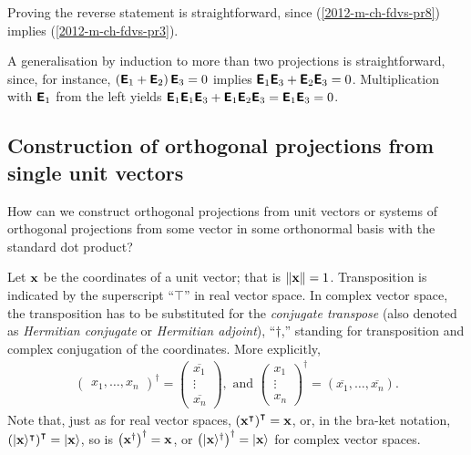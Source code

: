 {Proving the reverse statement is straightforward, since (\ref{2012-m-ch-fdvs-pr8}) implies  (\ref{2012-m-ch-fdvs-pr3}).

A generalisation by induction to more than two projections is straightforward,
since, for instance,
$\left(\textsf{\textbf{E}}_1+\textsf{\textbf{E}}_2\right)\textsf{\textbf{E}}_3=0$
implies
$ \textsf{\textbf{E}}_1\textsf{\textbf{E}}_3+\textsf{\textbf{E}}_2\textsf{\textbf{E}}_3=0$.
Multiplication with $\textsf{\textbf{E}}_1$ from the left yields
$
\textsf{\textbf{E}}_1\textsf{\textbf{E}}_1\textsf{\textbf{E}}_3+\textsf{\textbf{E}}_1\textsf{\textbf{E}}_2\textsf{\textbf{E}}_3=
\textsf{\textbf{E}}_1 \textsf{\textbf{E}}_3=
0$.
 \eproof }


\subsection{Construction of orthogonal projections from  single unit vectors}

How can we construct  orthogonal projections from unit vectors or systems of orthogonal projections from some vector in some orthonormal basis
with the standard dot product?

Let ${\bf x}$ be the coordinates of a unit vector;
that is $\|{\bf x} \| =1$.
Transposition is indicated by the superscript ``$\intercal$''
in real vector space.
In complex vector space, the transposition has to be substituted
 for the {\em conjugate transpose} (also denoted as
{\em Hermitian conjugate} or {\em Hermitian adjoint}),
``$\dagger$,'' standing for transposition and complex conjugation of the coordinates.
More explicitly,
\begin{equation}
\begin{split}
\begin{pmatrix}x_1,\ldots, x_n\end{pmatrix}^\dagger =
\begin{pmatrix}
\overline{x_1}\\ \vdots\\ \overline{x_n}
\end{pmatrix}
,  \textrm{ and }
\begin{pmatrix}
x_1\\ \vdots\\ x_n
\end{pmatrix}^\dagger
= (\overline{x_1},\ldots, \overline{x_n})
.
\end{split}
\end{equation}
Note that, just as for real vector spaces,
$\left({\bf x}^\intercal \right)^\intercal ={\bf x}$,
or, in the bra-ket notation,
$\left(\vert {\bf x}\rangle^\intercal \right)^\intercal =\vert {\bf x}\rangle$,
 so is
$\left({\bf x}^\dagger \right)^\dagger={\bf x}$,
or
$\left(\vert  {\bf x}\rangle ^\dagger \right)^\dagger= \vert{\bf x} \rangle$ for complex vector spaces.

